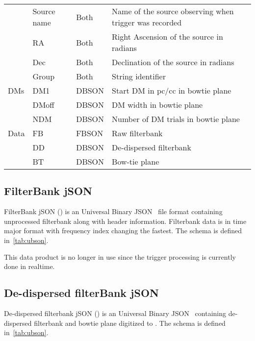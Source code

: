 \begin{table}
\begin{tabular}{llll}
																	& Source name & Both    & Name of the source observing when trigger was recorded \\
																	& RA          & Both    & Right Ascension of the source in radians               \\
																	& Dec         & Both    & Declination of the source in radians                   \\
																	& Group       & Both    & String identifier                                      \\
		DMs                         & DM1         & DBSON   & Start DM in pc/cc in bowtie plane                      \\
																& DMoff       & DBSON   & DM width in bowtie plane                               \\
																& NDM         & DBSON   & Number of DM trials in bowtie plane                    \\
		Data                        & FB          & FBSON   & Raw filterbank                                         \\
																& DD          & DBSON   & De-dispersed filterbank                                \\
																& BT          & DBSON   & Bow-tie plane                                          \\ \hline
	\end{tabular}
\end{table}
\subsection {FilterBank jSON}
\par FilterBank jSON (\fbson) is an Universal Binary JSON~\cite{ubjson} file format containing unprocessed filterbank along with header information. Filterbank data is in time major format with frequency index changing the fastest.
The schema is defined in~\autoref{tab:ubson}. 
\par This data product is no longer in use since the trigger processing is currently done in realtime.
\subsection {De-dispersed filterBank jSON}
\label{ssub:dbson}
\par De-dispersed filterbank jSON (\dbson) is an Universal Binary JSON~\cite{ubjson} containing de-dispersed filterbank and bowtie plane digitized to \uchar.
The schema is defined in~\autoref{tab:ubson}.
